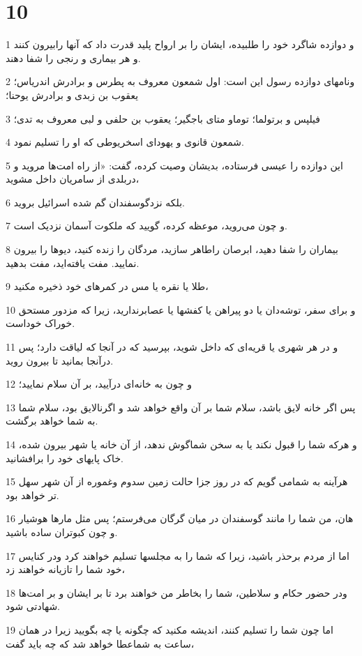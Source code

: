 \chapter{10}

\par 1 و دوازده شاگرد خود را طلبیده، ایشان را بر ارواح پلید قدرت داد که آنها رابیرون کنند و هر بیماری و رنجی را شفا دهند.
\par 2 ونامهای دوازده رسول این است: اول شمعون معروف به پطرس و برادرش اندریاس؛ یعقوب بن زبدی و برادرش یوحنا؛
\par 3 فیلپس و برتولما؛ توماو متای باجگیر؛ یعقوب بن حلفی و لبی معروف به تدی؛
\par 4 شمعون قانوی و یهودای اسخریوطی که او را تسلیم نمود.
\par 5 این دوازده را عیسی فرستاده، بدیشان وصیت کرده، گفت: «از راه امت‌ها مروید و دربلدی از سامریان داخل مشوید،
\par 6 بلکه نزدگوسفندان گم شده اسرائیل بروید.
\par 7 و چون می‌روید، موعظه کرده، گویید که ملکوت آسمان نزدیک است.
\par 8 بیماران را شفا دهید، ابرصان راطاهر سازید، مردگان را زنده کنید، دیوها را بیرون نمایید. مفت یافته‌اید، مفت بدهید.
\par 9 طلا یا نقره یا مس در کمرهای خود ذخیره مکنید،
\par 10 و برای سفر، توشه‌دان یا دو پیراهن یا کفشها یا عصابرندارید، زیرا که مزدور مستحق خوراک خوداست.
\par 11 و در هر شهری یا قریه‌ای که داخل شوید، بپرسید که در آنجا که لیاقت دارد؛ پس درآنجا بمانید تا بیرون روید.
\par 12 و چون به خانه‌ای درآیید، بر آن سلام نمایید؛
\par 13 پس اگر خانه لایق باشد، سلام شما بر آن واقع خواهد شد و اگرنالایق بود، سلام شما به شما خواهد برگشت.
\par 14 و هر‌که شما را قبول نکند یا به سخن شماگوش ندهد، از آن خانه یا شهر بیرون شده، خاک پایهای خود را برافشانید.
\par 15 هرآینه به شمامی گویم که در روز جزا حالت زمین سدوم وغموره از آن شهر سهل تر خواهد بود.
\par 16 هان، من شما را مانند گوسفندان در میان گرگان می‌فرستم؛ پس مثل مارها هوشیار و چون کبوتران ساده باشید.
\par 17 اما از مردم برحذر باشید، زیرا که شما را به مجلسها تسلیم خواهند کرد ودر کنایس خود شما را تازیانه خواهند زد،
\par 18 ودر حضور حکام و سلاطین، شما را بخاطر من خواهند برد تا بر ایشان و بر امت‌ها شهادتی شود.
\par 19 اما چون شما را تسلیم کنند، اندیشه مکنید که چگونه یا چه بگویید زیرا در همان ساعت به شماعطا خواهد شد که چه باید گفت،
